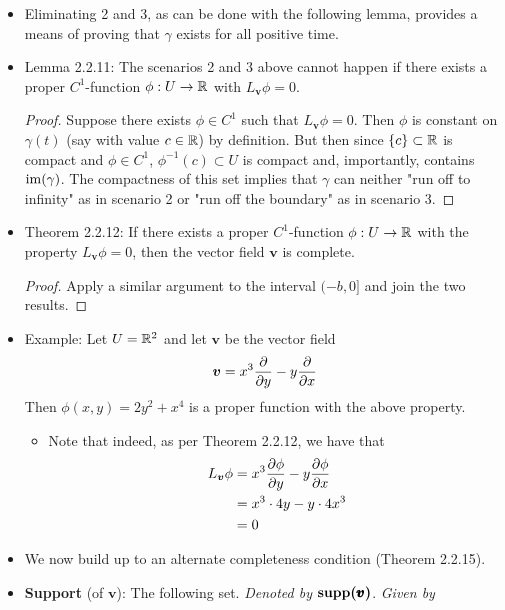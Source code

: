 \documentclass[../notes.tex]{subfiles}
\begin{document}
\begin{itemize}
\begin{enumerate}
    \end{enumerate}
    \item Eliminating 2 and 3, as can be done with the following lemma, provides a means of proving that $\gamma$ exists for all positive time.
    \item Lemma 2.2.11: The scenarios 2 and 3 above cannot happen if there exists a proper $C^1$-function $\phi:U\to\mathbb{R}$ with $L_{\bm{v}}\phi=0$.
    \begin{proof}
        Suppose there exists $\phi\in C^1$ such that $L_{\bm{v}}\phi=0$. Then $\phi$ is constant on $\gamma(t)$ (say with value $c\in\mathbb{R}$) by definition. But then since $\{c\}\subset\mathbb{R}$ is compact and $\phi\in C^1$, $\phi^{-1}(c)\subset U$ is compact and, importantly, contains $\operatorname{im}(\gamma)$. The compactness of this set implies that $\gamma$ can neither "run off to infinity" as in scenario 2 or "run off the boundary" as in scenario 3.
    \end{proof}
    \item Theorem 2.2.12: If there exists a proper $C^1$-function $\phi:U\to\mathbb{R}$ with the property $L_{\bm{v}}\phi=0$, then the vector field $\bm{v}$ is complete.
    \begin{proof}
        Apply a similar argument to the interval $(-b,0]$ and join the two results.
    \end{proof}
    \item Example: Let $U=\mathbb{R}^2$ and let $\bm{v}$ be the vector field
    \begin{equation*}
        \bm{v} = x^3\pdv{y}-y\pdv{x}
    \end{equation*}
    Then $\phi(x,y)=2y^2+x^4$ is a proper function with the above property.
    \begin{itemize}
        \item Note that indeed, as per Theorem 2.2.12, we have that
        \begin{align*}
            L_{\bm{v}}\phi &= x^3\pdv{\phi}{y}-y\pdv{\phi}{x}\\
            &= x^3\cdot 4y-y\cdot 4x^3\\
            &= 0
        \end{align*}
    \end{itemize}
    \item We now build up to an alternate completeness condition (Theorem 2.2.15).
    \item \textbf{Support} (of $\bm{v}$): The following set. \emph{Denoted by} $\bm{\supp(\pmb{v})}$. \emph{Given by}
    \begin{equation*}

\end{equation*}
\end{itemize}
\end{document}
